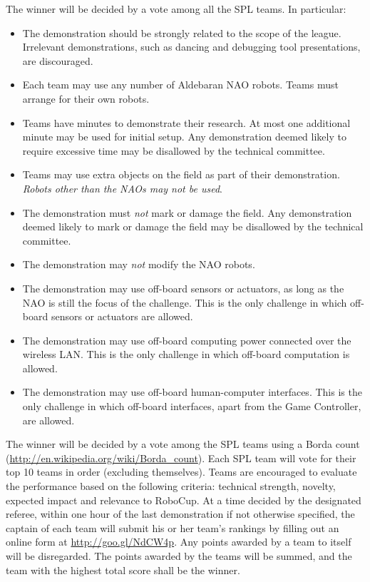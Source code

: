 \documentclass[12pt]{article}
\begin{document}
The winner will be decided by a vote among all the SPL teams. In particular:

\begin{itemize}
\item 
The demonstration should be strongly related to the scope of the league. 
Irrelevant demonstrations, such as dancing and debugging tool presentations, 
are discouraged.
\item 
Each team may use any number of Aldebaran NAO robots. Teams must arrange
for their own robots.
\item 
Teams have \openMinNum{} minutes to demonstrate their research. At most one 
additional minute may be used for initial setup. Any demonstration deemed
likely to require excessive time may be disallowed by the technical
committee.
\item 
Teams may use extra objects on the field as part of their
demonstration. \emph{Robots other than the NAOs may not be used}.
\item 
The demonstration must \emph{not} mark or damage the field. Any
demonstration deemed likely to mark or damage the field may be
disallowed by the technical committee.
\item
The demonstration may \emph{not} modify the NAO robots.
\item 
The demonstration may use off-board sensors or actuators, as long 
as the NAO is still the focus of the challenge.  This is the only 
challenge in which off-board sensors or actuators are allowed.
\item 
The demonstration may use off-board computing power connected over the
wireless LAN. This is the only challenge in which off-board
computation is allowed.
\item 
The demonstration may use off-board human-computer interfaces. This
is the only challenge in which off-board interfaces, apart from the
Game Controller, are allowed.
\end{itemize}

The winner will be decided by a vote among the SPL teams using a Borda
count (\url{http://en.wikipedia.org/wiki/Borda_count}). Each SPL 
team will vote for their top 10 teams in order (excluding themselves).
Teams are encouraged to evaluate the performance based on the
following criteria: technical strength, novelty, expected impact and
relevance to RoboCup. At a time decided by the designated referee,
within one hour of the last demonstration if not otherwise
specified, the captain of each team will submit his or her team's rankings 
by filling out an online form at \url{http://goo.gl/NdCW4p}.  Any points 
awarded by a team to itself will be disregarded. The points awarded by the 
teams will be summed, and the team with the highest total score shall be the winner.
\end{document}
